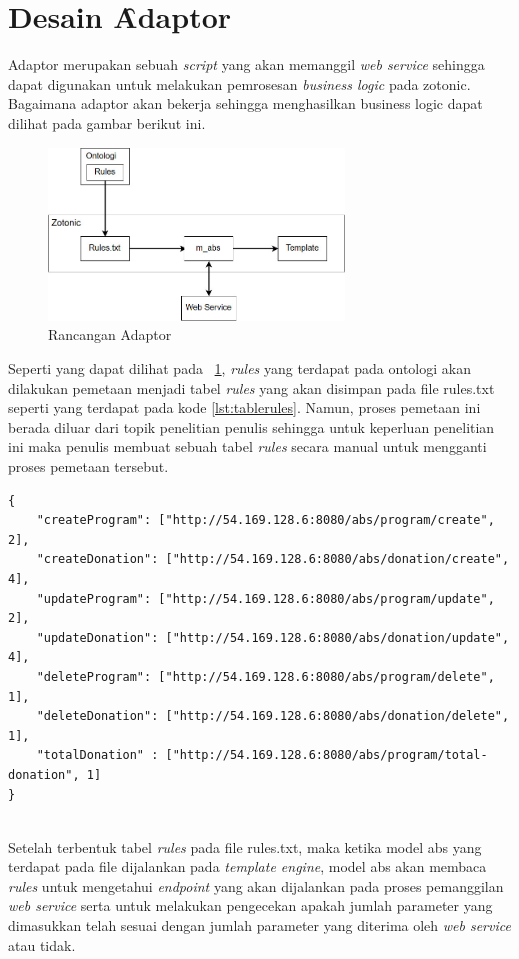 \section{Desain \f{Adaptor}}

Adaptor merupakan sebuah \textit{script} yang akan memanggil \textit{web service} sehingga dapat digunakan untuk melakukan pemrosesan \textit{business logic} pada zotonic. Bagaimana adaptor akan bekerja sehingga menghasilkan business logic dapat dilihat pada gambar berikut ini.

\begin{figure}
	\centering
	\includegraphics[width=0.7\textwidth]
		{pics/adaptor.jpg}
	\caption{Rancangan Adaptor}
	\label{fig:adaptor}
\end{figure}
\vspace{-0.3cm}

Seperti yang dapat dilihat pada \pic~\ref{fig:adaptor}, \textit{rules} yang terdapat pada ontologi akan dilakukan pemetaan menjadi tabel \textit{rules} yang akan disimpan pada file rules.txt seperti yang terdapat pada kode \ref{lst:tablerules}. Namun, proses pemetaan ini berada diluar dari topik penelitian penulis sehingga untuk keperluan penelitian ini maka penulis membuat sebuah tabel \textit{rules} secara manual untuk mengganti proses pemetaan tersebut.

\begin{minipage}{\linewidth}
\begin{lstlisting}[caption={Contoh tabel \textit{rules}},label={lst:tablerules}]
{
	"createProgram": ["http://54.169.128.6:8080/abs/program/create", 2],
	"createDonation": ["http://54.169.128.6:8080/abs/donation/create", 4],
	"updateProgram": ["http://54.169.128.6:8080/abs/program/update", 2],
	"updateDonation": ["http://54.169.128.6:8080/abs/donation/update", 4],
	"deleteProgram": ["http://54.169.128.6:8080/abs/program/delete", 1],
	"deleteDonation": ["http://54.169.128.6:8080/abs/donation/delete", 1],
	"totalDonation" : ["http://54.169.128.6:8080/abs/program/total-donation", 1]
}
\end{lstlisting}
\end{minipage} \\

Setelah terbentuk tabel \textit{rules} pada file rules.txt, maka ketika model abs yang terdapat pada file dijalankan pada \textit{template engine}, model abs akan membaca \textit{rules} untuk mengetahui \textit{endpoint} yang akan dijalankan pada proses pemanggilan \textit{web service} serta untuk melakukan pengecekan apakah jumlah parameter yang dimasukkan telah sesuai dengan jumlah parameter yang diterima oleh \textit{web service} atau tidak.